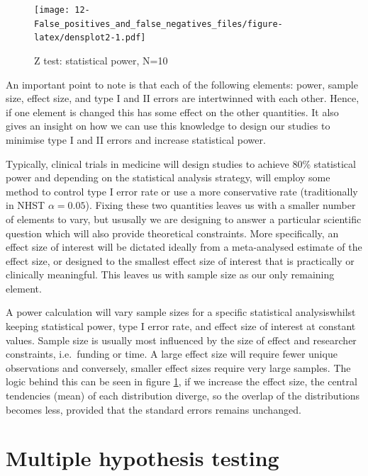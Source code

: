 \documentclass[]{book}
\begin{document}
\begin{figure}
\centering
\texttt{[image: 12-False\_positives\_and\_false\_negatives\_files/figure-latex/densplot2-1.pdf]}
\caption{\label{fig:densplot2}Z test: statistical power, N=10}
\end{figure}

An important point to note is that each of the following elements: power, sample size, effect size, and type I and II errors are intertwinned with each other. Hence, if one element is changed this has some effect on the other quantities. It also gives an insight on how we can use this knowledge to design our studies to minimise type I and II errors and increase statistical power.

Typically, clinical trials in medicine will design studies to achieve 80\% statistical power and depending on the statistical analysis strategy, will employ some method to control type I error rate or use a more conservative rate (traditionally in NHST \(\alpha=0.05\)). Fixing these two quantities leaves us with a smaller number of elements to vary, but ususally we are designing to answer a particular scientific question which will also provide theoretical constraints. More specifically, an effect size of interest will be dictated ideally from a meta-analysed estimate of the effect size, or designed to the smallest effect size of interest that is practically or clinically meaningful. This leaves us with sample size as our only remaining element.

A power calculation will vary sample sizes for a specific statistical analysiswhilst keeping statistical power, type I error rate, and effect size of interest at constant values. Sample size is usually most influenced by the size of effect and researcher constraints, i.e.~funding or time. A large effect size will require fewer unique observations and conversely, smaller effect sizes require very large samples. The logic behind this can be seen in figure \ref{fig:densplot2}, if we increase the effect size, the central tendencies (mean) of each distribution diverge, so the overlap of the distributions becomes less, provided that the standard errors remains unchanged.

\hypertarget{multiple-hypothesis-testing}{%
\section{Multiple hypothesis testing}\label{multiple-hypothesis-testing}}
\end{document}

